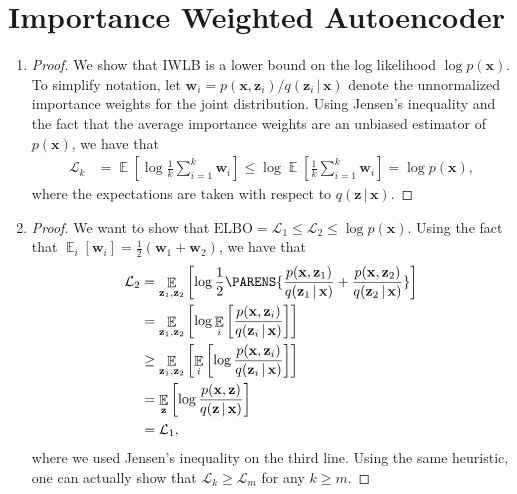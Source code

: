 \documentclass[table]{article}
\def\*#1{\mathbf{#1}}
\DeclareMathOperator{\ex}{\mathbb{E}}
\newcommand{\given}{\,|\,}
\begin{document}
\section{Importance Weighted Autoencoder}
\begin{enumerate}[label=(\alph*)]
  \item \begin{proof}
      We show that IWLB is a lower bound on the log likelihood $\log p(\*x)$. To simplify notation, let $\*w_i = p(\*x, 
      \*z_i) / q(\*z_i\given \*x)$ denote the unnormalized importance weights for the joint distribution. Using Jensen's inequality and the fact that the average importance weights are an unbiased estimator of $p(\*x)$, we have that
      \begin{align*}
        \mathcal{L}_k &= \ex \left[\log \frac{1}{k} \sum_{i=1}^k \*w_i \right]
                     \leq \log \ex \left[ \frac{1}{k} \sum_{i=1}^k \*w_i \right]
                     = \log p(\*x),
      \end{align*}
      where the expectations are taken with respect to $q(\*z \given \*x)$.
    \end{proof}
  \item \begin{proof} We want to show that $\mathrm{ELBO} = \mathcal{L}_1 \leq \mathcal{L}_2 \leq \log p(\*x)$. Using the fact that $\ex_i[\*w_i] = \tfrac{1}{2}(\*w_1 + \*w_2)$, we have that
      \begin{align*}
        \mathcal{L}_2 &= \ex_{\*z_1,\*z_2} \left[\log \frac{1}{2} \PARENS{\frac{p(\*x,\*z_1)}{q(\*z_1\given \*x)} +  \frac{p(\*x,\*z_2)}{q(\*z_2\given \*x)}} \right] \\
                      &=\ex_{\*z_1,\*z_2} \left[\log \ex_i \left[\frac{p(\*x,\*z_i)}{q(\*z_i\given \*x)}\right] \right] \\
                      &\geq \ex_{\*z_1,\*z_2}\left[ \ex_i \left[ \log \frac{p(\*x,\*z_i)}{q(\*z_i\given \*x)}\right] \right] \\
                      &=  \ex_{\*z} \left[ \log \frac{p(\*x,\*z)}{q(\*z\given \*x)}\right] \\
                      &= \mathcal{L}_1,
      \end{align*}
      where we used Jensen's inequality on the third line. Using the same heuristic, one can actually show that $\mathcal{L}_k \geq \mathcal{L}_m$ for any $k \geq m$.

    \end{proof}
\end{enumerate}
\end{document}
